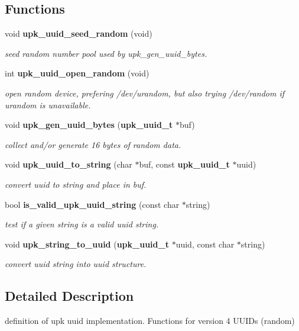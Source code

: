 \subsection*{Functions}
\begin{DoxyCompactItemize}
\item 
void {\bf upk\_\-uuid\_\-seed\_\-random} (void)
\begin{DoxyCompactList}\small\item\em seed random number pool used by upk\_\-gen\_\-uuid\_\-bytes. \end{DoxyCompactList}\item 
int {\bf upk\_\-uuid\_\-open\_\-random} (void)
\begin{DoxyCompactList}\small\item\em open random device, prefering /dev/urandom, but also trying /dev/random if urandom is unavailable. \end{DoxyCompactList}\item 
void {\bf upk\_\-gen\_\-uuid\_\-bytes} ({\bf upk\_\-uuid\_\-t} $\ast$buf)
\begin{DoxyCompactList}\small\item\em collect and/or generate 16 bytes of random data. \end{DoxyCompactList}\item 
void {\bf upk\_\-uuid\_\-to\_\-string} (char $\ast$buf, const {\bf upk\_\-uuid\_\-t} $\ast$uuid)
\begin{DoxyCompactList}\small\item\em convert uuid to string and place in buf. \end{DoxyCompactList}\item 
bool {\bf is\_\-valid\_\-upk\_\-uuid\_\-string} (const char $\ast$string)
\begin{DoxyCompactList}\small\item\em test if a given string is a valid uuid string. \end{DoxyCompactList}\item 
void {\bf upk\_\-string\_\-to\_\-uuid} ({\bf upk\_\-uuid\_\-t} $\ast$uuid, const char $\ast$string)
\begin{DoxyCompactList}\small\item\em convert uuid string into uuid structure. \end{DoxyCompactList}\end{DoxyCompactItemize}


\subsection{Detailed Description}
definition of upk uuid implementation. Functions for version 4 UUIDs (random) 